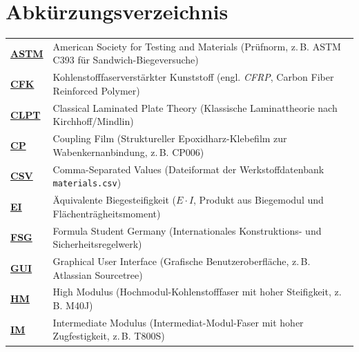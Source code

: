 \chapter*{Abkürzungsverzeichnis}
\vspace{-1em}

\noindent
\begin{tabularx}{\textwidth}{@{}l >{\raggedright\arraybackslash}X@{}}
\label{abk:ASTM}\hyperref[sec:continuous_improvement]{\textbf{ASTM}} & American Society for Testing and Materials (Prüfnorm, z.\,B. ASTM C393 für Sandwich-Biegeversuche) \\[0.4ex]
\label{abk:CFK}\hyperref[sec:systemzweck]{\textbf{CFK}}   & Kohlenstofffaserverstärkter Kunststoff (engl. \textit{CFRP}, Carbon Fiber Reinforced Polymer) \\[0.4ex]
\label{abk:CLPT}\hyperref[sec:systemgrenzen]{\textbf{CLPT}} & Classical Laminated Plate Theory (Klassische Laminattheorie nach Kirchhoff/Mindlin) \\[0.4ex]
\label{abk:CP}\hyperref[sec:fertigungsrichtlinien]{\textbf{CP}}     & Coupling Film (Struktureller Epoxidharz-Klebefilm zur Wabenkernanbindung, z.\,B. CP006) \\[0.4ex]
\label{abk:CSV}\hyperref[sec:materials_db]{\textbf{CSV}}   & Comma-Separated Values (Dateiformat der Werkstoffdatenbank \texttt{materials.csv}) \\[0.4ex]
\label{abk:EI}\hyperref[sec:calc_single_panel]{\textbf{EI}}     & Äquivalente Biegesteifigkeit ($E \cdot I$, Produkt aus Biegemodul und Flächenträgheitsmoment) \\[0.4ex]
\label{abk:FSG}\hyperref[sec:fsg_rules]{\textbf{FSG}}   & Formula Student Germany (Internationales Konstruktions- und Sicherheitsregelwerk) \\[0.4ex]
\label{abk:GUI}\hyperref[sec:sourcetree]{\textbf{GUI}}   & Graphical User Interface (Grafische Benutzeroberfläche, z.\,B. Atlassian Sourcetree) \\[0.4ex]
\label{abk:HM}\hyperref[sec:materials_db]{\textbf{HM}}     & High Modulus (Hochmodul-Kohlenstofffaser mit hoher Steifigkeit, z.\,B. M40J) \\[0.4ex]
\label{abk:IM}\hyperref[sec:materials_db]{\textbf{IM}}     & Intermediate Modulus (Intermediat-Modul-Faser mit hoher Zugfestigkeit, z.\,B. T800S) \\[0.4ex]

\end{tabularx}
